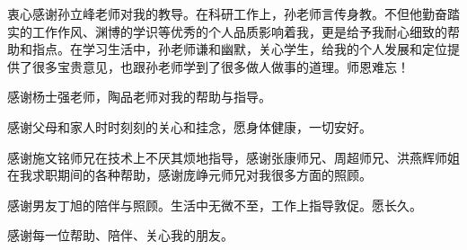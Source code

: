 \begin{ack}

衷心感谢孙立峰老师对我的教导。在科研工作上，孙老师言传身教。不但他勤奋踏实的工作作风、渊博的学识等优秀的个人品质影响着我，更是给予我耐心细致的帮助和指点。在学习生活中，孙老师谦和幽默，关心学生，给我的个人发展和定位提供了很多宝贵意见，也跟孙老师学到了很多做人做事的道理。师恩难忘！

感谢杨士强老师，陶品老师对我的帮助与指导。

感谢父母和家人时时刻刻的关心和挂念，愿身体健康，一切安好。

感谢施文铭师兄在技术上不厌其烦地指导，感谢张康师兄、周超师兄、洪燕辉师姐在我求职期间的各种帮助，感谢庞峥元师兄对我很多方面的照顾。

感谢男友丁旭的陪伴与照顾。生活中无微不至，工作上指导敦促。愿长久。

感谢每一位帮助、陪伴、关心我的朋友。

\end{ack}





